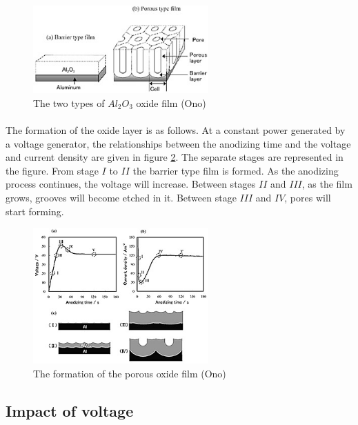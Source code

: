 \documentclass[a4paper]{article}
\begin{document}
\begin{figure}[ht]
  \centering
  \includegraphics[width=0.6\textwidth]{img/ono-films}
  \caption{The two types of $Al_2O_3$ oxide film (Ono)}
  \label{fig:ono-films}
\end{figure}

\paragraph*{}
The formation of the oxide layer is as follows. At a constant power generated
by a voltage generator, the relationships between the anodizing time and the
voltage and current density are given in figure \ref{fig:ono-relationship}. The
separate stages are represented in the figure. From stage $I$ to $II$ the
barrier type film is formed. As the anodizing process continues, the voltage
will increase. Between stages $II$ and $III$, as the film grows, grooves will
become etched in it. Between stage $III$ and $IV$, pores will start forming.

\begin{figure}[ht]
  \centering
  \includegraphics[width=0.6\textwidth]{img/ono-relationship}
  \caption{The formation of the porous oxide film (Ono)}
  \label{fig:ono-relationship}
\end{figure}

\subsection{Impact of voltage}
\end{document}

